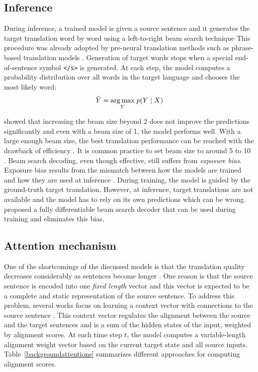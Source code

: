 \subsection{Inference} \label{bgrnninference}

During inference, a trained model is given a source sentence and it generates the target translation word by word using a left-to-right beam search technique \citep{jelinek98}
This procedure was already adopted by pre-neural translation methods such as phrase-based translation models \citep{koehn-etal-2003-statistical}. 
Generation of target words stops when a special end-of-sentence symbol \mbox{\texttt{\textless /s\textgreater}} is generated. 
At each step, the model computes a probability distribution over all words in the target language and chooses the most likely word:
\begin{align}
\hat{Y} = \underset{Y}{\operatorname*{arg\,max}} \; p({Y} \mid {X})
\end{align}

\citet{sutskever2014sequence} showed that increasing the beam size beyond 2 does not improve the predictions significantly and even with a beam size of 1, the model performs well. 
With a large enough beam size, the best translation performance can be reached with the drawback of efficiency \citep{freitag-al-onaizan-2017-beam}.
It is common practice to set beam size to around 5 to 10 \citep{wu2016google,edunov-etal-2018-understanding}.
Beam search decoding, even though effective, still suffers from \textit{exposure bias}.
Exposure bias results from the mismatch between how the models are trained and how they are used at inference \citep{wiseman-rush-2016-sequence,DBLP:journals/corr/RanzatoCAZ15}.
During training, the model is guided by the ground-truth target translation. 
However, at inference, target translations are not available and the model has to rely on its own predictions which can be wrong.
\citet{collobert2019a} proposed a fully differentiable beam search decoder that can be used during training and eliminates this bias.


\subsection{Attention mechanism} \label{BGlstmATT}

One of the shortcomings of the discussed models is that the translation quality decreases considerably as sentences become longer \citep{koehn2017six}.
One reason is that the source sentence is encoded into one \textit{fixed length} vector and this vector is expected to be a complete and static representation of the source sentence.
To address this problem, several works focus on learning a context vector with connections to the source sentence \citep{Graves2014NeuralTM,DBLP:journals/corr/BahdanauCB14,luong:2015:EMNLP}. 
This context vector regulates the alignment between the source and the target sentences and is a sum of the hidden states of the input, weighted by alignment scores.
At each time step $t$, the model computes a variable-length alignment weight vector based on the current target state and all source inputs. 
Table~\ref{backgroundattentions} summarizes different approaches for computing alignment scores.

